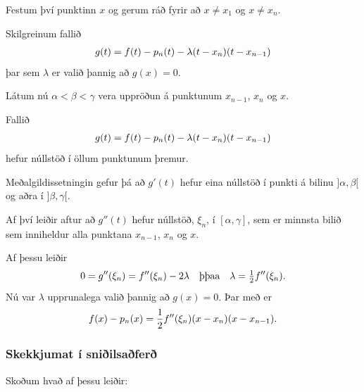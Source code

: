 \documentclass[a4paper,10pt,icelandic]{sphinxmanual}
\begin{document}
Festum því punktinn \(x\) og gerum ráð fyrir að \(x\neq x_1\) og
\(x\neq x_n\).

Skilgreinum fallið
\begin{gather}
\begin{split}g(t)=f(t)-p_n(t)-\lambda(t-x_n)(t-x_{n-1})\end{split}\notag
\end{gather}
þar sem \(\lambda\) er valið þannig að \(g(x)=0\).

Látum nú \(\alpha<\beta<\gamma\) vera uppröðun á punktunum
\(x_{n-1}\), \(x_n\) og \(x\).

Fallið
\begin{gather}
\begin{split}g(t)=f(t)-p_n(t)-\lambda(t-x_n)(t-x_{n-1})\end{split}\notag
\end{gather}
hefur núllstöð í öllum punktunum þremur.

Meðalgildissetningin gefur þá að \(g'(t)\) hefur eina núllstöð í
punkti á bilinu \(]\alpha,\beta[\) og aðra í \(]\beta,\gamma[\).

Af því leiðir aftur að \(g''(t)\) hefur núllstöð, \(\xi_n\), í
\([\alpha,\gamma]\), sem er minnsta bilið sem inniheldur alla
punktana \(x_{n-1}\), \(x_n\) og \(x\).

Af þessu leiðir
\begin{gather}
\begin{split}0=g''(\xi_n)=f''(\xi_n)-2\lambda \quad \text{þþaa} \quad
\lambda=\tfrac 12 f''(\xi_n).\end{split}\notag
\end{gather}
Nú var \(\lambda\) upprunalega valið þannig að \(g(x)=0\). Þar
með er
\begin{gather}
\begin{split}f(x) - p_n(x) = \frac{1}{2}f''(\xi_n)(x-x_n)(x-x_{n-1}).\end{split}\notag
\end{gather}

\subsubsection{Skekkjumat í sniðilsaðferð}
\label{kafli02:skekkjumat-i-sniilsafer}
Skoðum hvað af þessu leiðir:
\end{document}
